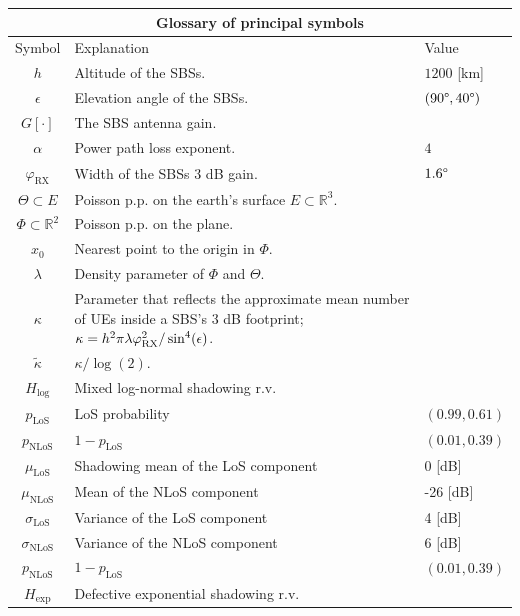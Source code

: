 \documentclass[lettersize,journal]{IEEEtran}
\newcommand{\R}{\mathbb{R}}
\begin{document}
\begin{table}
  \begin{center}
    \begin{tabular}{| c | p{4.5cm}  |p{1.5cm}|}
      \hline
      \multicolumn{3}{|c|}{Glossary of principal symbols} \\
      \hline
      Symbol& Explanation &Value
      \\ 
      \hline
      $h$ & Altitude of the SBSs.&$1200$ [km] \\
      $\epsilon$ & Elevation angle of the SBSs.& $(90 \degree,40 \degree)$ \\
      $G[\cdot]$ & The SBS antenna gain.&\\
      $\alpha$ &Power path loss exponent.& $4$\\
      $\varphi_{\text{RX}}$ & Width of the SBSs $3$ dB gain.& $1.6 \degree$  \\
      $\Theta \subset E $ & Poisson p.p. on the earth's surface $E \subset \R^3$.& \\
      $\Phi \subset \R^2$ & Poisson p.p. on the plane. &\\
      $x_0$ & Nearest point to the origin in $\Phi$.&  \\
      $\lambda$ & Density parameter of $\Phi$ and $\Theta$.& \\
      $\kappa$ & Parameter that reflects the approximate mean number of UEs inside a SBS's $3$ dB footprint;  $\kappa = h^2\pi \lambda \varphi_{\textup{RX}}^2/\sin^4(\epsilon)$.& \\
      ${\tilde{\kappa}}$ &  $\kappa/\log(2)$.&\\
      $H_{\text{log}}$ & Mixed log-normal shadowing r.v.&     \\
      $p_{\text{LoS}}$& LoS probability & $(0.99,0.61)$\\
      $p_{\text{NLoS}}$&  $1-p_{\text{LoS}}$ & $(0.01,0.39)$\\
      $\mu_{\text{LoS}}$& Shadowing mean of the LoS component & 0 [dB] \\
      $\mu_{\text{NLoS}}$& Mean of the NLoS component & -26 [dB] \\
      $\sigma_{\text{LoS}}$& Variance of the LoS component & 4 [dB] \\
      $\sigma_{\text{NLoS}}$& Variance of the NLoS component & 6 [dB] \\
      $p_{\text{NLoS}}$&  $1-p_{\text{LoS}}$ & $(0.01,0.39)$\\
      $H_{\text{exp}}$ & Defective exponential shadowing r.v.    & \\

\end{tabular}
\end{center}
\end{table}
\end{document}
